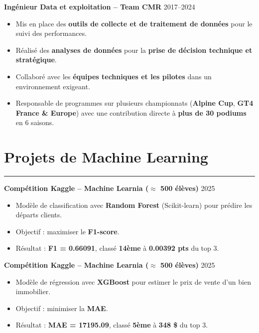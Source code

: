 \documentclass[a4paper,12pt]{article}
\newcommand{\sectionrule}[1]{%
  \section*{#1}%
  \vspace{-1em}%
  {\color{bleufonce}\noindent\rule{\linewidth}{1pt}}%
  \vspace{0.5em}%
}
\begin{document}
\begin{paracol}{2}
\begin{rightcolumn}
\begin{minipage}[t][\dimexpr\textheight - 9em\relax][t]{\dimexpr\linewidth - 1.5em\relax}
{\textbf{Ingénieur Data et exploitation – Team CMR} \hfill {\color{blue}2017–2024}  
\begin{itemize}[leftmargin=1em, nosep]
  \vspace{0.2em}
  \item Mis en place des \textbf{outils de collecte et de traitement de données} pour le suivi des performances.
  \vspace{0.2em}
  \item Réalisé des \textbf{analyses de données} pour la \textbf{prise de décision technique et stratégique}.
  \vspace{0.2em}
  \item Collaboré avec les \textbf{équipes techniques et les pilotes} dans un environnement exigeant.
  \vspace{0.2em}
  \item Responsable de programmes sur plusieurs championnats (\textbf{Alpine Cup}, \textbf{GT4 France \& Europe}) avec une contribution directe à \textbf{plus de 30 podiums} en 6 saisons.
\end{itemize}

\vspace{0.7em}
\sectionrule{Projets de Machine Learning}

\textbf{Compétition Kaggle – Machine Learnia ($\approx$ 500 élèves)} \hfill {\color{blue}2025}  
\begin{itemize}[leftmargin=1em, nosep]
  \vspace{0.2em}
  \item Modèle de classification avec \textbf{Random Forest} (Scikit-learn) pour prédire les départs clients.
  \item Objectif : maximiser le \textbf{F1-score}. 
  \item Résultat : \textbf{F1 = 0.66091}, classé \textbf{14ème} à \textbf{0.00392 pts} du top 3.
\end{itemize}

\vspace{0.7em}

\textbf{Compétition Kaggle – Machine Learnia ($\approx$ 500 élèves)} \hfill {\color{blue}2025}  
\begin{itemize}[leftmargin=1em, nosep]
  \vspace{0.2em}
  \item Modèle de régression avec \textbf{XGBoost} pour estimer le prix de vente d’un bien immobilier.
  \item Objectif : minimiser la \textbf{MAE}. 
  \item Résultat : \textbf{MAE = 17195.09}, classé \textbf{5ème} à \textbf{348 \$} du top 3.
\end{itemize}

} %
\end{minipage}
\end{rightcolumn}

\end{paracol}
\end{document}

